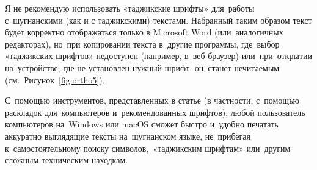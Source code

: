 Я не рекомендую использовать «таджикские шрифты» для~работы с~шугнанскими (как и с таджикскими) текстами. Набранный таким образом текст будет корректно отображаться только в Microsoft Word (или~аналогичных редакторах), но~при копировании текста в~другие программы, где~выбор «таджикских шрифтов» недоступен (например, в~веб-браузер) или~при~открытии на~устройстве, где не установлен нужный шрифт, он~станет нечитаемым (см.~Рисунок~\ref{fig:ortho5}).

С~помощью инструментов, представленных в статье (в частности, с~помощью раскладок для~компьютеров и~рекомендованных шрифтов), любой пользователь компьютеров на~Windows или macOS сможет быстро и~удобно печатать аккуратно выглядящие тексты на~шугнанском языке, не~прибегая к~самостоятельному поиску символов,~«таджикским шрифтам» или~другим сложным техническим находкам.